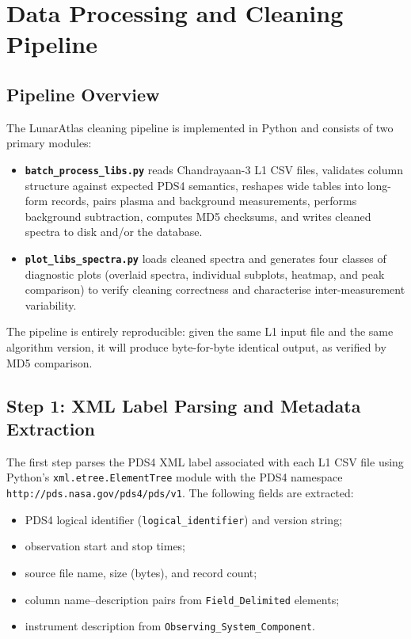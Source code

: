 \documentclass[a4paper,twocolumn,10pt]{article}
\begin{document}
\section{Data Processing and Cleaning Pipeline}
\label{sec:processing}

\subsection{Pipeline Overview}

The LunarAtlas cleaning pipeline is implemented in Python and consists
of two primary modules:

\begin{itemize}[nosep,leftmargin=*]
  \item \textbf{\texttt{batch\_process\_libs.py}} reads Chandrayaan-3
    L1 CSV files, validates column structure against expected PDS4
    semantics, reshapes wide tables into long-form records, pairs
    plasma and background measurements, performs background
    subtraction, computes MD5 checksums, and writes cleaned spectra to
    disk and/or the database.

  \item \textbf{\texttt{plot\_libs\_spectra.py}} loads cleaned spectra
    and generates four classes of diagnostic plots (overlaid spectra,
    individual subplots, heatmap, and peak comparison) to verify
    cleaning correctness and characterise inter-measurement variability.
\end{itemize}

The pipeline is entirely reproducible: given the same L1 input file
and the same algorithm version, it will produce byte-for-byte identical
output, as verified by MD5 comparison.

\subsection{Step 1: XML Label Parsing and Metadata Extraction}

The first step parses the PDS4 XML label associated with each L1 CSV
file using Python's \texttt{xml.etree.ElementTree} module with the
PDS4 namespace \texttt{http://pds.nasa.gov/pds4/pds/v1}.  The
following fields are extracted:

\begin{itemize}[nosep,leftmargin=*]
  \item PDS4 logical identifier (\texttt{logical\_identifier}) and
    version string;
  \item observation start and stop times;
  \item source file name, size (bytes), and record count;
  \item column name--description pairs from
    \texttt{Field\_Delimited} elements;
  \item instrument description from
    \texttt{Observing\_System\_Component}.
\end{itemize}
\end{document}
